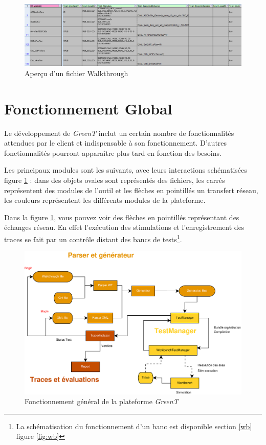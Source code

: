 \begin{figure}[H]
	\hspace{-35px}
	\includegraphics[width=20cm]{contents/images/walkthrough.png}
	\caption{Aperçu d'un fichier Walkthrough}
\end{figure}

\section{Fonctionnement Global}
Le développement de \textit{GreenT} inclut un certain nombre de fonctionnalités attendues par le client et indispensable à son fonctionnement. D'autres fonctionnalités pourront apparaître plus tard en fonction des besoins.

Les principaux modules sont les suivants, avec leurs interactions schématisées figure \ref{fig:generalDiag} : 
dans des objets ovales sont représentés des fichiers, les carrés représentent des modules de l'outil et les flèches en pointillés un transfert réseau, les couleurs représentent les différents modules de la plateforme.

Dans la figure \ref{fig:generalDiag}, vous pouvez voir des flèches en pointillés représentant des échanges réseau. En effet
l'exécution des stimulations et l'enregistrement des traces se fait par un contrôle distant des bancs de tests\footnote{La
	schématisation du fonctionnement d'un banc est disponible section \ref{wb} figure \ref{fig:wb}}.

\begin{figure}[H]
	\centering
	\vspace{-10px}
	\includegraphics[width=15.0cm]{contents/images/generalDiag.eps}
	\caption{Fonctionnement général de la plateforme \textit{GreenT}}
	\label{fig:generalDiag}
\end{figure}	


